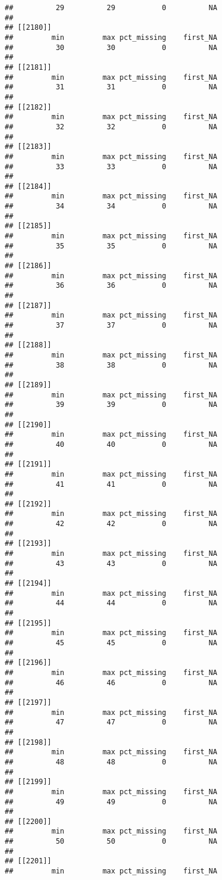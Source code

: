 \documentclass[
]{article}
\begin{document}
\begin{verbatim}
##          29          29           0          NA 
## 
## [[2180]]
##         min         max pct_missing    first_NA 
##          30          30           0          NA 
## 
## [[2181]]
##         min         max pct_missing    first_NA 
##          31          31           0          NA 
## 
## [[2182]]
##         min         max pct_missing    first_NA 
##          32          32           0          NA 
## 
## [[2183]]
##         min         max pct_missing    first_NA 
##          33          33           0          NA 
## 
## [[2184]]
##         min         max pct_missing    first_NA 
##          34          34           0          NA 
## 
## [[2185]]
##         min         max pct_missing    first_NA 
##          35          35           0          NA 
## 
## [[2186]]
##         min         max pct_missing    first_NA 
##          36          36           0          NA 
## 
## [[2187]]
##         min         max pct_missing    first_NA 
##          37          37           0          NA 
## 
## [[2188]]
##         min         max pct_missing    first_NA 
##          38          38           0          NA 
## 
## [[2189]]
##         min         max pct_missing    first_NA 
##          39          39           0          NA 
## 
## [[2190]]
##         min         max pct_missing    first_NA 
##          40          40           0          NA 
## 
## [[2191]]
##         min         max pct_missing    first_NA 
##          41          41           0          NA 
## 
## [[2192]]
##         min         max pct_missing    first_NA 
##          42          42           0          NA 
## 
## [[2193]]
##         min         max pct_missing    first_NA 
##          43          43           0          NA 
## 
## [[2194]]
##         min         max pct_missing    first_NA 
##          44          44           0          NA 
## 
## [[2195]]
##         min         max pct_missing    first_NA 
##          45          45           0          NA 
## 
## [[2196]]
##         min         max pct_missing    first_NA 
##          46          46           0          NA 
## 
## [[2197]]
##         min         max pct_missing    first_NA 
##          47          47           0          NA 
## 
## [[2198]]
##         min         max pct_missing    first_NA 
##          48          48           0          NA 
## 
## [[2199]]
##         min         max pct_missing    first_NA 
##          49          49           0          NA 
## 
## [[2200]]
##         min         max pct_missing    first_NA 
##          50          50           0          NA 
## 
## [[2201]]
##         min         max pct_missing    first_NA 

\end{verbatim}
\end{document}
